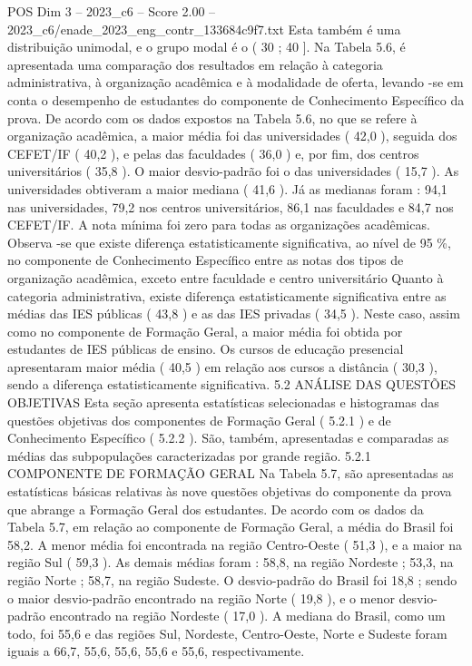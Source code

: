 \begin{textsample}{POS Dim 3 – 2023\_c6 – Score 2.00 – 2023\_c6/enade\_2023\_eng\_contr\_133684c9f7.txt}
Esta também é uma distribuição unimodal, e o grupo modal é o ( 30 ; 40 ].
Na Tabela 5.6, é apresentada uma comparação dos resultados em relação à categoria administrativa, à organização acadêmica e à modalidade de oferta, levando -se em conta o desempenho de estudantes do componente de Conhecimento Específico da prova.
De acordo com os dados expostos na Tabela 5.6, no que se refere à organização acadêmica, a maior média foi das universidades ( 42,0 ), seguida dos CEFET/IF ( 40,2 ), e pelas das faculdades ( 36,0 ) e, por fim, dos centros universitários ( 35,8 ).
O maior desvio-padrão foi o das universidades ( 15,7 ).
As universidades obtiveram a maior mediana ( 41,6 ).
Já as medianas foram : 94,1 nas universidades, 79,2 nos centros universitários, 86,1 nas faculdades e 84,7 nos CEFET/IF.
A nota mínima foi zero para todas as organizações acadêmicas.
Observa -se que existe diferença estatisticamente significativa, ao nível de 95 \%, no componente de Conhecimento Específico entre as notas dos tipos de organização acadêmica, exceto entre faculdade e centro universitário Quanto à categoria administrativa, existe diferença estatisticamente significativa entre as médias das IES públicas ( 43,8 ) e as das IES privadas ( 34,5 ).
Neste caso, assim como no componente de Formação Geral, a maior média foi obtida por estudantes de IES públicas de ensino.
Os cursos de educação presencial apresentaram maior média ( 40,5 ) em relação aos cursos a distância ( 30,3 ), sendo a diferença estatisticamente significativa. 5.2 ANÁLISE DAS QUESTÕES OBJETIVAS Esta seção apresenta estatísticas selecionadas e histogramas das questões objetivas dos componentes de Formação Geral ( 5.2.1 ) e de Conhecimento Específico ( 5.2.2 ).
São, também, apresentadas e comparadas as médias das subpopulações caracterizadas por grande região. 5.2.1 COMPONENTE DE FORMAÇÃO GERAL Na Tabela 5.7, são apresentadas as estatísticas básicas relativas às nove questões objetivas do componente da prova que abrange a Formação Geral dos estudantes.
De acordo com os dados da Tabela 5.7, em relação ao componente de Formação Geral, a média do Brasil foi 58,2.
A menor média foi encontrada na região Centro-Oeste ( 51,3 ), e a maior na região Sul ( 59,3 ).
As demais médias foram : 58,8, na região Nordeste ; 53,3, na região Norte ; 58,7, na região Sudeste.
O desvio-padrão do Brasil foi 18,8 ; sendo o maior desvio-padrão encontrado na região Norte ( 19,8 ), e o menor desvio-padrão encontrado na região Nordeste ( 17,0 ).
A mediana do Brasil, como um todo, foi 55,6 e das regiões Sul, Nordeste, Centro-Oeste, Norte e Sudeste foram iguais a 66,7, 55,6, 55,6, 55,6 e 55,6, respectivamente.

\end{textsample}
